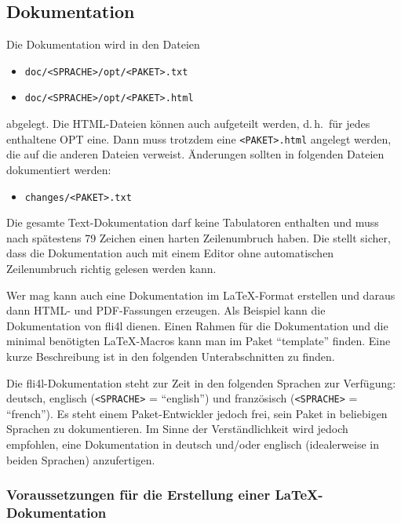 \subsection{Dokumentation}

    Die Dokumentation wird in den Dateien

    \begin{itemize}
    \item \texttt{doc/<SPRACHE>/opt/<PAKET>.txt}
    \item \texttt{doc/<SPRACHE>/opt/<PAKET>.html}
    \end{itemize}

    abgelegt. Die HTML-Dateien können auch aufgeteilt werden, d.\,h.\ für jedes
    enthaltene OPT eine. Dann muss trotzdem eine \texttt{<PAKET>.html} angelegt
    werden, die auf die anderen Dateien verweist.
    Änderungen sollten in folgenden Dateien dokumentiert werden:

    \begin{itemize}
    \item \texttt{changes/<PAKET>.txt}
    \end{itemize}

    Die gesamte Text-Dokumentation darf keine Tabulatoren enthalten und muss nach
    spätestens 79 Zeichen einen harten Zeilenumbruch haben. Die stellt sicher,
    dass die Dokumentation auch mit einem Editor ohne automatischen
    Zeilenumbruch richtig gelesen werden kann.

    Wer mag kann auch eine Dokumentation im \LaTeX-Format erstellen und daraus
    dann HTML- und PDF-Fassungen erzeugen. Als Beispiel kann
    die Dokumentation von fli4l dienen. Einen Rahmen für die
    Dokumentation und die minimal benötigten \LaTeX-Macros kann man im
    Paket "`template"' finden. Eine kurze Beschreibung ist in den
    folgenden Unterabschnitten zu finden.

    Die fli4l-Dokumentation steht zur Zeit in den folgenden Sprachen zur
    Verfügung: deutsch, englisch (\texttt{<SPRACHE>} = "`english"') und
    französisch (\texttt{<SPRACHE>} = "`french"'). Es steht einem
    Paket-Entwickler jedoch frei, sein Paket in beliebigen Sprachen zu
    dokumentieren. Im Sinne der Verständlichkeit wird jedoch empfohlen,
    eine Dokumentation in deutsch und/oder englisch (idealerweise in beiden
    Sprachen) anzufertigen.

\subsubsection{Voraussetzungen für die Erstellung einer \LaTeX-Dokumentation}

